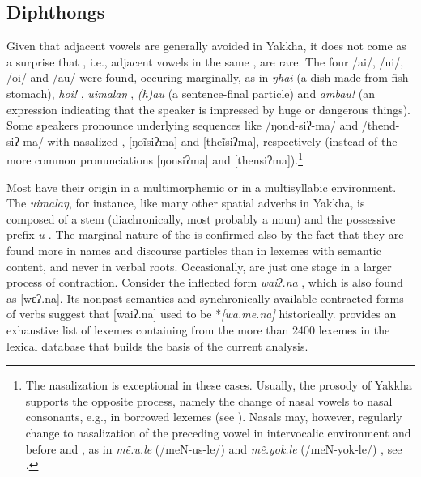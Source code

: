 \subsection{Diphthongs}\label{diphth}

Given that adjacent vowels are generally avoided in Yakkha, it does not come as a surprise that , i.e., adjacent vowels in the same , are rare. The four  /ai/, /ui/, /oi/ and /au/ were found, occuring marginally, as in \emph{ŋhai} (a dish made from fish stomach), \emph{hoi!} ,  \emph{uimalaŋ} , \emph{(h)au} (a sentence-final  particle) and \emph{ambau!} (an   expression indicating that the speaker is impressed by huge or dangerous things). Some speakers pronounce underlying sequences like /ŋond-siʔ-ma/ and /thend-siʔ-ma/ with nasalized , [ŋoĩsiʔma] and [theĩsiʔma], respectively (instead of the more common pronunciations [ŋonsiʔma] and [thensiʔma]).\footnote{The nasalization is exceptional in these cases. Usually, the prosody of Yakkha supports the opposite process, namely the change of nasal vowels to nasal consonants, e.g., in borrowed  lexemes (see ). Nasals may, however, regularly change to nasalization of the preceding vowel in intervocalic environment and before  and , as in \emph{mẽ.u.le} (/meN-us-le/)   and \emph{mẽ.yok.le} (/meN-yok-le/) , see .} 

Most  have their origin in a multimorphemic or in a multisyllabic environment. The  \emph{uimalaŋ}, for instance, like many other spatial adverbs in Yakkha, is composed of a stem (diachronically, most probably a noun) and the possessive prefix \emph{u-}. The marginal nature of the  is confirmed also by the fact  that they are found more in names and discourse particles than in lexemes with semantic content, and never in verbal roots. Occasionally,  are just one stage in a larger process of contraction. Consider the inflected form \emph{waiʔ.na} , which is also found as [wɛʔ.na]. Its nonpast semantics and synchronically available contracted forms of verbs suggest that [waiʔ.na]  used to be *\emph{[wa.me.na] } historically.  provides an exhaustive list of lexemes containing  from the more than 2400 lexemes in the lexical database that builds the basis of the current analysis.



